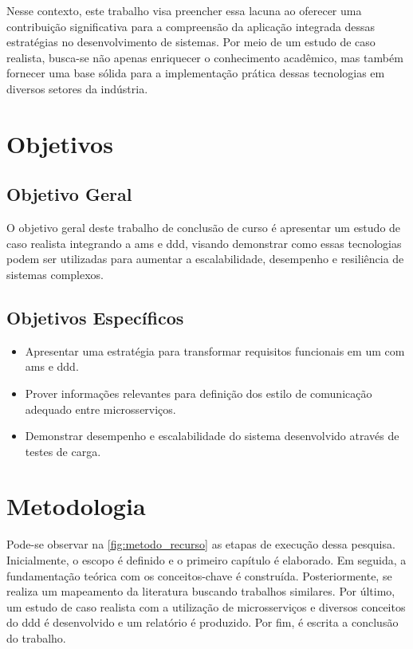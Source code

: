Nesse contexto, este trabalho visa preencher essa lacuna ao oferecer uma contribuição significativa para a compreensão da aplicação integrada dessas estratégias no desenvolvimento de sistemas. Por meio de um estudo de caso realista, busca-se não apenas enriquecer o conhecimento acadêmico, mas também fornecer uma base sólida para a implementação prática dessas tecnologias em diversos setores da indústria.

\section{Objetivos}

\subsection{Objetivo Geral}
O objetivo geral deste trabalho de conclusão de curso é apresentar um estudo de caso realista integrando a \acrlong{ams} e \acrlong{ddd}, visando demonstrar como essas tecnologias podem ser utilizadas para aumentar a escalabilidade, desempenho e resiliência de sistemas complexos.


\subsection{Objetivos Específicos}
\begin{itemize}
\item Apresentar uma estratégia para transformar requisitos funcionais em um  com \acrshort{ams} e \acrshort{ddd}.
\item Prover informações relevantes para definição dos estilo de comunicação adequado entre microsserviços.
\item Demonstrar desempenho e escalabilidade do sistema desenvolvido através de testes de carga.
\end{itemize}

\section{Metodologia}
Pode-se observar na \autoref{fig:metodo_recurso} as etapas de execução dessa pesquisa. Inicialmente, o escopo é definido e o primeiro capítulo é elaborado. Em seguida, a fundamentação teórica com os conceitos-chave é construída. Posteriormente, se realiza um mapeamento da literatura buscando trabalhos similares. Por último, um estudo de caso realista com a utilização de microsserviços e diversos conceitos do \acrshort{ddd} é desenvolvido e um relatório é produzido. Por fim, é escrita a conclusão do trabalho.

